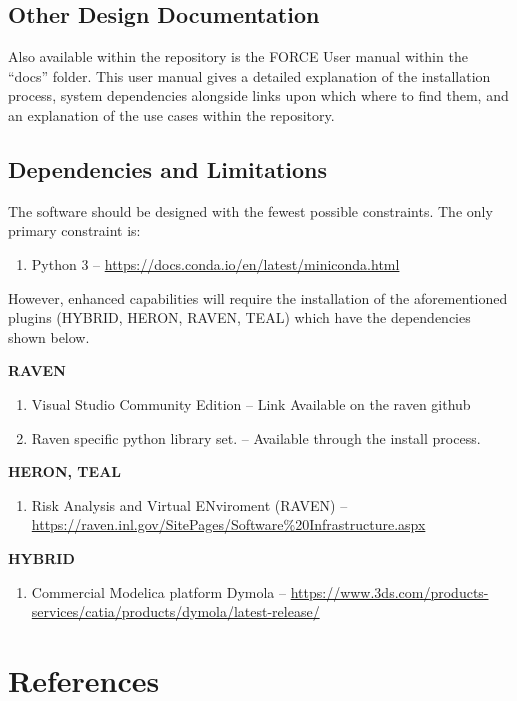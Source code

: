 
\subsection{Other Design Documentation}
Also available within the repository is the FORCE User manual within the “docs” folder. This user manual gives a detailed explanation of the installation process, system dependencies alongside links upon which where to find them, and an explanation of the use cases within the repository. 

\subsection{Dependencies and Limitations}
The software should be designed with the fewest possible constraints. 
The only primary constraint is:
\begin{enumerate}
 \item Python 3 -- \url{https://docs.conda.io/en/latest/miniconda.html}
 
 \end{enumerate} 
 
 However, enhanced capabilities will require the installation of the aforementioned plugins (HYBRID, HERON, RAVEN, TEAL) which have the dependencies shown below. 
 
 \textbf{RAVEN}
  \begin{enumerate}
 \item Visual Studio Community Edition -- Link Available on the raven github
 \item Raven specific python library set. -- Available through the install process. 
 \end{enumerate} 
 
 \textbf{HERON, TEAL}
 \begin{enumerate}
 \item Risk Analysis and Virtual ENviroment (RAVEN) -- \url{https://raven.inl.gov/SitePages/Software%20Infrastructure.aspx}
 \end{enumerate} 
  
  \textbf{HYBRID}
 \begin{enumerate}
 \item Commercial Modelica platform Dymola -- \url{https://www.3ds.com/products-services/catia/products/dymola/latest-release/}
   \end{enumerate}
  
 

\section{References}

